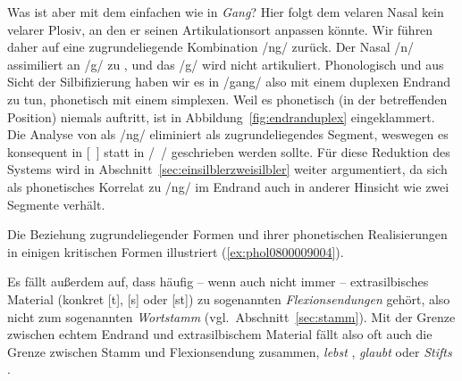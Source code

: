 Was ist aber mit dem einfachen \textipa{[N]} wie in \textit{Gang}?
Hier folgt dem velaren Nasal kein velarer Plosiv, an den er seinen Artikulationsort anpassen könnte.
Wir führen \textipa{[N]} daher auf eine zugrundeliegende Kombination /ng/ zurück.
Der Nasal /n/ assimiliert an /g/ zu \textipa{[N]}, und das /g/ wird nicht artikuliert. 
Phonologisch und aus Sicht der Silbifizierung haben wir es \zB in /gang/ also mit einem duplexen Endrand zu tun, phonetisch mit einem simplexen.
Weil es phonetisch (in der betreffenden Position) niemals auftritt, ist \textipa{[g]} in Abbildung~\ref{fig:endranduplex} eingeklammert.
Die Analyse von \textipa{[N]} als /ng/ eliminiert \textipa{[N]} als zugrundeliegendes Segment, weswegen es konsequent in [~] statt in /~/ geschrieben werden sollte.
Für diese Reduktion des Systems wird in Abschnitt~\ref{sec:einsilblerzweisilbler} weiter argumentiert, da sich \textipa{[N]} als phonetisches Korrelat zu /ng/ im Endrand auch in anderer Hinsicht wie zwei Segmente verhält.

Die Beziehung zugrundeliegender Formen und ihrer phonetischen Realisierungen in einigen kritischen Formen illustriert (\ref{ex:phol0800009004}).

\begin{exe}
  \ex \label{ex:phol0800009004}
  \begin{xlist}
  \end{xlist}
\end{exe}

Es fällt außerdem auf, dass häufig -- wenn auch nicht immer -- extrasilbisches Material (konkret [t], [s] oder [st]) zu sogenannten \textit{Flexionsendungen} gehört, also nicht zum sogenannten \textit{Wortstamm} (vgl.\ Abschnitt~\ref{sec:stamm}).
Mit der Grenze zwischen echtem Endrand und extrasilbischem Material fällt also oft auch die Grenze zwischen Stamm und Flexionsendung zusammen, \zB \textit{lebst} \textipa{[le:p+st]}, \textit{glaubt} \textipa{[gl\t{aO}p+t]} oder \textit{Stifts} \textipa{[StIft+s]}.

